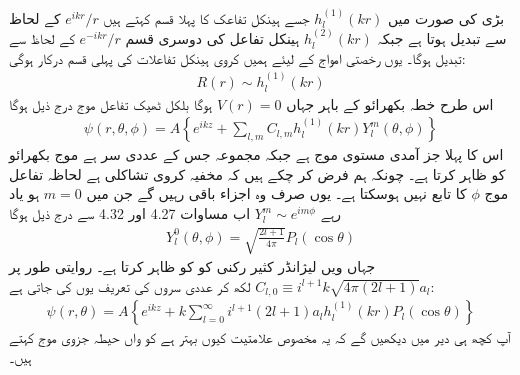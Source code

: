 بڑی  کی صورت میں \(h_l^{(1)}(kr)\) جسے ہینکل تفاعک کا پہلا قسم کہتے ہیں \(e^{ikr}/r\) کے لحاظ سے تبدیل ہوتا ہے جبکہ \(h_l^{(2)}(kr)\) ہینکل تفاعل کی دوسری قسم \(e^{-ikr}/r\) کے لحاظ سے تبدیل ہوگا۔ یوں رخصتی امواج کے لیئے ہمیں کروی ہینکل تفاعلات کی پہلی قسم درکار ہوگی:
\begin{align}
	R(r)\sim h^{(1)}_l(kr)
\end{align}
اس طرح خطہ بکھرائو کے باہر جہاں \(V(r) = 0\) ہوگا بلکل ٹھیک تفاعل موج درج ذیل ہوگا
\begin{align}
	\psi(r, \theta, \phi) = A\left\{e^{ikz}+\sum_{l, m}C_{l, m}h^{(1)}_l(kr)Y^m_l(\theta, \phi)\right\}
\end{align}
اس کا پہلا جز آمدی مستوی موج ہے جبکہ مجموعہ جس کے عددی سر  ہے موج بکھرائو کو ظاہر کرتا ہے۔ چونکہ ہم فرض کر چکے ہیں کہ مخفیہ کروی تشاکلی ہے لحاظہ تفاعل موج \(\phi\) کا تابع نہیں ہوسکتا ہے۔ یوں صرف وہ اجزاء باقی رہیں گے جن میں \(m=0\) ہو یاد رہے \(Y_l^m\sim e^{im\phi}\) اب مساوات \num{4.27} اور \num{4.32} سے درج ذیل ہوگا
\begin{align}
	Y^0_l(\theta, \phi) = \sqrt{\frac{2l+1}{4\pi}}P_l(\cos\theta)
\end{align}
جہاں  ویں لیژانڈر کثیر رکنی کو  کو ظاہر کرتا ہے۔ روایتی طور پر \(C_{l, 0}\equiv i^{l+1}k\sqrt{4\pi(2l+1)}a_l\) لکھ کر عددی سروں کی تعریف یوں کی جاتی ہے:
\begin{align}
	\psi(r, \theta) = A\left\{e^{ikz}+k\sum_{l=0}^{\infty}i^{l+1}(2l+1)a_lh_l^{(1)}(kr)P_l(\cos\theta)\right\}
\end{align}
آپ کچھ ہی دیر میں دیکھیں گے کہ یہ مخصوص علامتیت کیوں بہتر ہے  کو  واں حیطہ جزوی موج کہتے ہیں۔

